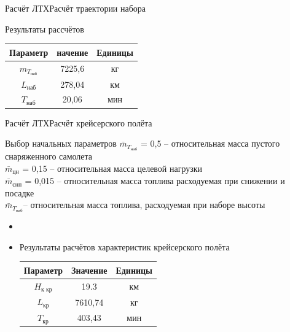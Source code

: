 \begin{frame}{Расчёт ЛТХ}{Расчёт траектории набора}
    \begin{block}{Результаты рассчётов}
    \begin{table}
        \begin{tabular}{|c|c|c|}
            \hline
            Параметр&  начение & Единицы  \\ \hline
            $m_{T_{\text{наб}}}$& 7225,6 &кг \\ \hline
            $L_\text{наб}$& 278,04 &км \\ \hline
            $T_\text{наб}$& 20,06 & мин\\ \hline
        \end{tabular}
    \end{table}
    \end{block}
\end{frame}

\begin{frame}{Расчёт ЛТХ}{Расчёт крейсерского полёта}
    \begin{block}{Выбор начальных параметров}
        $\bar{m}_{T_\text{наб}}$ = 0,5 – относительная масса пустого снаряженного самолета \\ 
        $\bar{m}_\text{цн}$ = 0,15 – относительная масса целевой нагрузки \\ 
        $\bar{m}_\text{снп}$ = 0,015 – относительная масса топлива 
        расходуемая при снижении и посадке  \\
        $\bar{m}_{T_\text{наб}}$– относительная масса топлива, расходуемая при наборе высоты \\
    \end{block}
    \begin{itemize}
        \item <+-> []
    \item <+-> [] \begin{block}{Результаты расчётов характеристик крейсерского полёта}
        \begin{table}
            \begin{tabular}{|c|c|c|}
                \hline
                Параметр& Значение & Единицы\\ \hline
                $H_\text{к \ кр}$& 19.3 & км\\ \hline
                $L_\text{кр}$& 7610,74 &кг \\ \hline
                $T_\text{кр}$& 403,43 & мин\\ \hline
            \end{tabular}
        \end{table}
    \end{block}
    \end{itemize}
\end{frame} 

